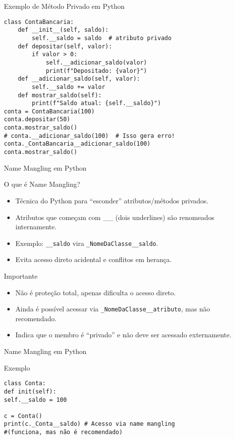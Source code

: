 \begin{frame}[fragile]{Exemplo de Método Privado em Python}
\small
\begin{verbatim}
class ContaBancaria:
    def __init__(self, saldo):
        self.__saldo = saldo  # atributo privado
    def depositar(self, valor):
        if valor > 0:
            self.__adicionar_saldo(valor)
            print(f"Depositado: {valor}")
    def __adicionar_saldo(self, valor):
        self.__saldo += valor
    def mostrar_saldo(self):
        print(f"Saldo atual: {self.__saldo}")
conta = ContaBancaria(100)
conta.depositar(50)
conta.mostrar_saldo()
# conta.__adicionar_saldo(100)  # Isso gera erro!
conta._ContaBancaria__adicionar_saldo(100)
conta.mostrar_saldo()
\end{verbatim}

\end{frame}




\begin{frame}[fragile]{Name Mangling em Python}

\begin{block}{O que é Name Mangling?}
\begin{itemize}
\item Técnica do Python para “esconder” atributos/métodos privados.
\item Atributos que começam com \_\_ (dois underlines) são renomeados internamente.
\item Exemplo: \texttt{\_\_saldo} vira \texttt{\_NomeDaClasse\_\_saldo}.
\item Evita acesso direto acidental e conflitos em herança.
\end{itemize}
\end{block}

\begin{block}{Importante}
\begin{itemize}
\item Não é proteção total, apenas dificulta o acesso direto.
\item Ainda é possível acessar via \texttt{\_NomeDaClasse\_\_atributo}, mas não recomendado.
\item Indica que o membro é “privado” e não deve ser acessado externamente.
\end{itemize}
\end{block}
\end{frame}


\begin{frame}[fragile]{Name Mangling em Python}
\begin{exampleblock}{Exemplo}
\begin{verbatim}
class Conta:
def init(self):
self.__saldo = 100

c = Conta()
print(c._Conta__saldo) # Acesso via name mangling 
#(funciona, mas não é recomendado)
\end{verbatim}
\end{exampleblock}

\end{frame}

